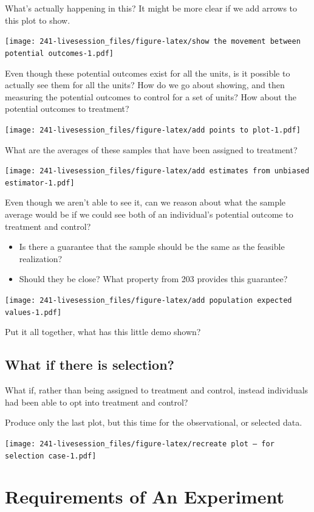 \documentclass[
]{book}
\providecommand{\tightlist}{%
  \setlength{\itemsep}{0pt}\setlength{\parskip}{0pt}}
\begin{document}
What's actually happening in this? It might be more clear if we add
arrows to this plot to show.

\texttt{[image: 241-livesession\_files/figure-latex/show the movement between potential outcomes-1.pdf]}

Even though these potential outcomes exist for all the units, is it
possible to actually see them for all the units? How do we go about
showing, and then measuring the potential outcomes to control for a set
of units? How about the potential outcomes to treatment?

\texttt{[image: 241-livesession\_files/figure-latex/add points to plot-1.pdf]}

What are the averages of these samples that have been assigned to
treatment?

\texttt{[image: 241-livesession\_files/figure-latex/add estimates from unbiased estimator-1.pdf]}

Even though we aren't able to see it, can we reason about what the
sample average would be if we could see both of an individual's
potential outcome to treatment and control?

\begin{itemize}
\tightlist
\item
  Is there a guarantee that the sample should be the same as the
  feasible realization?
\item
  Should they be close? What property from 203 provides this guarantee?
\end{itemize}

\texttt{[image: 241-livesession\_files/figure-latex/add population expected values-1.pdf]}

Put it all together, what has this little demo shown?

\hypertarget{what-if-there-is-selection}{%
\subsection{What if there is
selection?}\label{what-if-there-is-selection}}

What if, rather than being assigned to treatment and control, instead
individuals had been able to opt into treatment and control?

Produce only the last plot, but this time for the observational, or
selected data.

\texttt{[image: 241-livesession\_files/figure-latex/recreate plot -- for selection case-1.pdf]}

\hypertarget{requirements-of-an-experiment}{%
\section{Requirements of An
Experiment}\label{requirements-of-an-experiment}}
\end{document}
